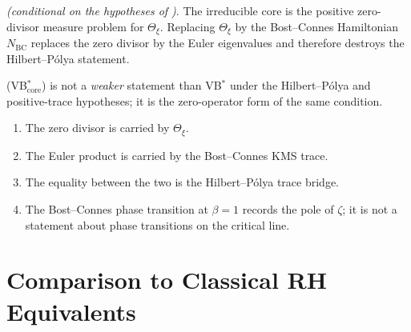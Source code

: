 \begin{corollary}
\label{v4-arith:vb:cor:irreducible-core}
\ClaimStatusProvedHere \emph{(conditional on the hypotheses of
)}. The irreducible core is the
positive zero-divisor measure problem for \(\Theta_{\xi}\). Replacing
\(\Theta_{\xi}\) by the Bost--Connes Hamiltonian \(N_{\mathrm{BC}}\)
replaces the zero divisor by the Euler eigenvalues and therefore
destroys the Hilbert--P\'olya statement.
\end{corollary}

\begin{remark}
\label{v4-arith:vb:rem:core-meaning}
(VB\(^{*}_{\mathrm{core}}\)) is not a \emph{weaker} statement than
VB\(^{*}\) under the Hilbert--P\'olya and positive-trace hypotheses; it
is the zero-operator form of the same condition.
\begin{enumerate}
\item The zero divisor is carried by \(\Theta_{\xi}\).
\item The Euler product is carried by the Bost--Connes KMS trace.
\item The equality between the two is the Hilbert--P\'olya trace
bridge.
\item The Bost--Connes phase transition at \(\beta=1\) records the
pole of \(\zeta\); it is not a statement about phase transitions on
the critical line.
\end{enumerate}
\end{remark}

\section{Comparison to Classical RH Equivalents}
\label{v4-arith:vb:comparison}

